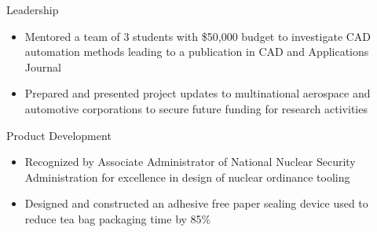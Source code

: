 \documentclass[]{friggeri-cv}
\begin{document}
\begin{entrylist}
    \entry
    {}
    {Leadership}
    {}
    {\vspace{-4mm}
    \begin{itemize}
    \item Mentored a team of 3 students with \$50,000 budget to investigate CAD automation methods leading to a publication in CAD and Applications Journal
    \item Prepared and presented project updates to multinational aerospace and automotive corporations to secure future funding for research activities
    \end{itemize}\vspace{1mm}}





    \entry
    {}
    {Product Development}
    {}
    {\vspace{-4mm}
    \begin{itemize}
        \item Recognized by Associate Administrator of National Nuclear Security Administration for excellence in design of nuclear ordinance tooling
        \item Designed and constructed an adhesive free paper sealing device used to reduce tea bag packaging time by 85\%
    \end{itemize}
    \vspace{1mm}}



\end{entrylist}
\end{document}
